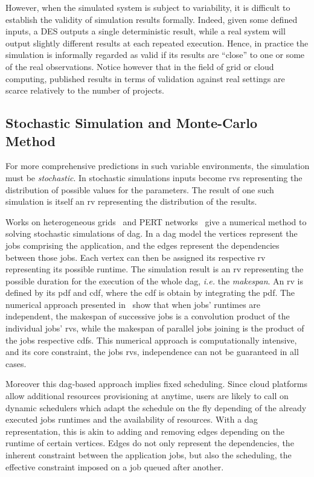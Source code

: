 \documentclass[10pt,conference,compsocconf]{IEEEtran}
\begin{document}
However, when the simulated system is subject to variability, it is difficult to
establish  the  validity of  simulation  results  formally. Indeed,  given  some
defined inputs, a DES outputs a single deterministic result, while a real system
will output  slightly different results  at each repeated execution.   Hence, in
practice  the simulation  is informally  regarded as  valid if  its results  are
``close'' to one or  some of the real observations.  Notice  however that in the
field  of grid  or cloud  computing, published  results in  terms of  validation
against real settings are scarce relatively to the number of projects.


\subsection{Stochastic Simulation and Monte-Carlo Method}

\label{sc:relwork-stochastic}
For  more   comprehensive  predictions  in  such   variable  environments,  the
simulation must  be \emph{stochastic}.  In stochastic simulations  inputs become
\acfp{rv} representing the  distribution of possible values  for the parameters.
The  result  of one  such  simulation  is  itself  an \ac{rv}  representing  the
distribution  of the  results. 

Works on heterogeneous grids~\cite{Li97} and PERT networks~\cite{Ludwig01} give
a numerical method to solving stochastic simulations of \ac{dag}. In a \ac{dag} model 
the vertices represent the jobs  comprising the application, and the edges represent
the dependencies between those jobs.  Each vertex can then be assigned its respective
\ac{rv}  representing   its  possible  runtime. The simulation result is an \ac{rv}
representing  the possible  duration for  the execution  of the  whole \ac{dag},
\textit{i.e.} the \emph{makespan}. An \ac{rv} is  defined by its \ac{pdf}  and \ac{cdf},
where  the   \ac{cdf}  is  obtain   by  integrating  the  \ac{pdf}.
The numerical approach presented in~\cite{Li97, Ludwig01} show  that
when  jobs' runtimes  are  independent, the  makespan of  successive  jobs is  a
convolution product  of the individual  jobs' \acp{rv}, while the  makespan of
parallel jobs joining is the  product of  the jobs respective  \acp{cdf}. This
numerical approach is computationally intensive, and its core constraint,
the jobs \acp{rv}, independence can not be guaranteed in all cases.

Moreover this \ac{dag}-based approach implies fixed scheduling. 
Since cloud platforms allow additional resources provisioning at anytime,
users are likely to call on dynamic schedulers which adapt the schedule on the fly
depending of the already executed jobs runtimes and the availability of
resources. With a \ac{dag} representation, this is akin to adding
and removing edges depending on the runtime of certain vertices. Edges do not
only represent the dependencies, the inherent constraint between the application
jobs, but also the scheduling, the effective constraint imposed on a job queued
after another.
\end{document}
